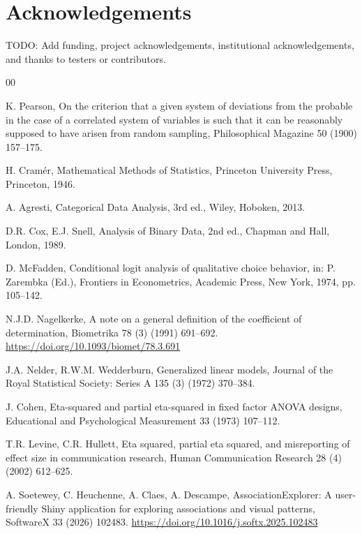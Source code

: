 \documentclass[preprint,12pt,a4paper]{elsarticle}
\begin{document}
\section*{Acknowledgements}

TODO: Add funding, project acknowledgements, institutional acknowledgements, and thanks to testers or contributors.

\begin{thebibliography}{00}

K. Pearson, On the criterion that a given system of deviations from the probable in the case of a correlated system of variables is such that it can be reasonably supposed to have arisen from random sampling, Philosophical Magazine 50 (1900) 157--175.

H. Cram\'er, Mathematical Methods of Statistics, Princeton University Press, Princeton, 1946.

A. Agresti, Categorical Data Analysis, 3rd ed., Wiley, Hoboken, 2013.

D.R. Cox, E.J. Snell, Analysis of Binary Data, 2nd ed., Chapman and Hall, London, 1989.

D. McFadden, Conditional logit analysis of qualitative choice behavior, in: P. Zarembka (Ed.), Frontiers in Econometrics, Academic Press, New York, 1974, pp. 105--142.

N.J.D. Nagelkerke, A note on a general definition of the coefficient of determination, Biometrika 78 (3) (1991) 691--692. \url{https://doi.org/10.1093/biomet/78.3.691}

J.A. Nelder, R.W.M. Wedderburn, Generalized linear models, Journal of the Royal Statistical Society: Series A 135 (3) (1972) 370--384.

J. Cohen, Eta-squared and partial eta-squared in fixed factor ANOVA designs, Educational and Psychological Measurement 33 (1973) 107--112.

T.R. Levine, C.R. Hullett, Eta squared, partial eta squared, and misreporting of effect size in communication research, Human Communication Research 28 (4) (2002) 612--625.

A. Soetewey, C. Heuchenne, A. Claes, A. Descampe, AssociationExplorer: A user-friendly Shiny application for exploring associations and visual patterns, SoftwareX 33 (2026) 102483. \url{https://doi.org/10.1016/j.softx.2025.102483}


\end{thebibliography}
\end{document}
